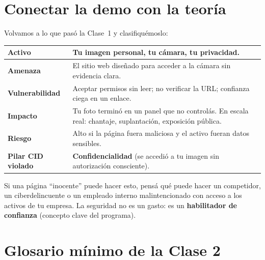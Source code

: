 \documentclass[12pt,a4paper]{article}
\begin{document}
\newpage
\section{Conectar la demo con la teoría}

Volvamos a lo que pasó la Clase~1 y clasifiquémoslo:

\begin{table}[h!]
\centering
\renewcommand{\arraystretch}{1.5}
\begin{tabularx}{\textwidth}{|>{\bfseries}p{3.2cm}|X|}
\hline
Activo       & Tu imagen personal, tu cámara, tu privacidad. \\
\hline
Amenaza      & El sitio web diseñado para acceder a la cámara sin evidencia clara. \\
\hline
Vulnerabilidad & Aceptar permisos sin leer; no verificar la URL; confianza ciega en un enlace. \\
\hline
Impacto      & Tu foto terminó en un panel que no controlás. En escala real: chantaje, suplantación, exposición pública. \\
\hline
Riesgo       & Alto si la página fuera maliciosa y el activo fueran datos sensibles. \\
\hline
Pilar CID violado & \textbf{Confidencialidad} (se accedió a tu imagen sin autorización consciente). \\
\hline
\end{tabularx}
\end{table}

\begin{cajaNota}[title={Lección para negocios digitales}]
Si una página ``inocente'' puede hacer esto, pensá qué puede hacer un
competidor, un ciberdelincuente o un empleado interno malintencionado con
acceso a los activos de tu empresa. La seguridad no es un gasto: es un
\textbf{habilitador de confianza} (concepto clave del programa).
\end{cajaNota}

\section{Glosario mínimo de la Clase 2}
\end{document}
